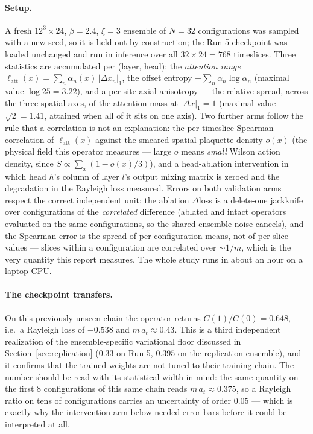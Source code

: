 \documentclass[11pt,a4paper]{article}
\newcommand{\at}{a_t}
\begin{document}
\paragraph{Setup.} A fresh $12^3\times24$, $\beta=2.4$, $\xi=3$ ensemble of
$N=32$ configurations was sampled with a new seed, so it is held out by
construction; the Run-5 checkpoint was loaded unchanged and run in inference
over all $32\times24=768$ timeslices. Three statistics are accumulated per
(layer, head): the \emph{attention range}
$\ell_{\mathrm{att}}(x)=\sum_n\alpha_n(x)\,|\Delta x_n|_1$, the offset entropy
$-\sum_n\alpha_n\log\alpha_n$ (maximal value $\log 25=3.22$), and a per-site
axial anisotropy --- the relative spread, across the three spatial axes, of the
attention mass at $|\Delta x|_1=1$ (maximal value $\sqrt2=1.41$, attained when
all of it sits on one axis). Two further arms follow the rule that a
correlation is not an explanation: the per-timeslice Spearman correlation of
$\ell_{\mathrm{att}}(x)$ against the smeared spatial-plaquette density $o(x)$
(the physical field this operator measures --- large $o$ means \emph{small}
Wilson action density, since $S\propto\sum_x(1-o(x)/3)$), and a head-ablation
intervention in which head $h$'s column of layer $l$'s output mixing matrix is
zeroed and the degradation in the Rayleigh loss measured. Errors on both
validation arms respect the correct independent unit: the ablation
$\Delta$loss is a delete-one jackknife over configurations of the
\emph{correlated} difference (ablated and intact operators evaluated on the
same configurations, so the shared ensemble noise cancels), and the Spearman
error is the spread of per-configuration means, not of per-slice values ---
slices within a configuration are correlated over $\sim1/m$, which is the very
quantity this report measures. The whole study runs in about an hour on a
laptop CPU.

\paragraph{The checkpoint transfers.} On this previously unseen chain the
operator returns $C(1)/C(0)=0.648$, i.e.\ a Rayleigh loss of $-0.538$ and
$m\,\at\approx0.43$. This is a third independent realization of the
ensemble-specific variational floor discussed in
Section~\ref{sec:replication} ($0.33$ on Run 5, $0.395$ on the replication
ensemble), and it confirms that the trained weights are not tuned to their
training chain. The number should be read with its statistical width in mind:
the same quantity on the first $8$ configurations of this same chain reads
$m\,\at\approx0.375$, so a Rayleigh ratio on tens of configurations carries an
uncertainty of order $0.05$ --- which is exactly why the intervention arm
below needed error bars before it could be interpreted at all.
\end{document}
